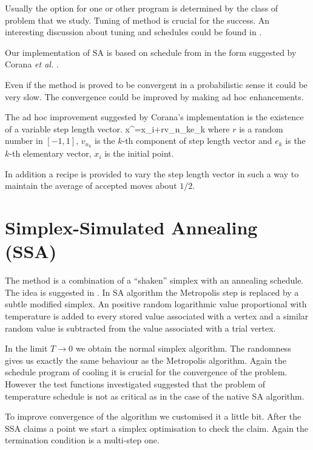 \par{Usually the option for one or other program is determined by the class of
problem that we study. Tuning of method is crucial for the success. An
interesting discussion about tuning and schedules could be found in
\citep{Ingber93}.}
\par{Our implementation of SA is based on schedule from 
in the form suggested by Corana \emph{et al.} \citep{Corana87}.}
\par{Even if the method is proved to be convergent in a probabilistic sense it could
be very slow. The convergence could be improved by making ad hoc
enhancements.}
\par{The ad hoc improvement suggested by Corana's implementation is the existence
of a variable step length vector.}
\be
x^{\prime}=x_i+rv_{n_k}e_k
\ee
where $r$ is a random number in $[-1,1]$, $v_{n_k}$ is the $k$-th component of
step length vector and $e_k$ is the $k$-th elementary vector, $x_i$ is the
initial point.
\par{In addition a recipe is provided to vary the step length vector in such a way
to maintain the average of accepted moves about $1/2$. }
\section{Simplex-Simulated Annealing (SSA)}
\par{The method is a combination of a ``shaken'' simplex with an annealing
schedule. The idea is suggested in \citep{Press07}. In SA algorithm the Metropolis step
is replaced by a subtle modified simplex. An positive random logarithmic value
proportional with temperature is added to every stored value associated with a
vertex and a similar random value is subtracted from the value associated
with a trial vertex.}
\par{In the limit $T\rightarrow 0$ we obtain the normal simplex algorithm. The
randomness gives us exactly the same behaviour as the Metropolis
algorithm. Again the schedule program of cooling it is crucial for the
convergence of the problem. However the test functions investigated suggested
that the problem of temperature schedule is not as critical as in the case of
the native SA algorithm.}
\par{To improve convergence of the algorithm we customised it a little bit. After
the SSA claims a point we start a simplex optimisation to check the
claim. Again the termination condition is a multi-step one. }
